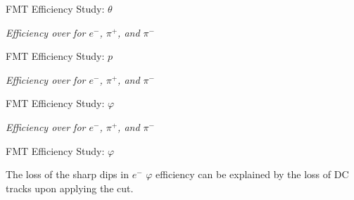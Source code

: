 \begin{frame}{FMT Efficiency Study: $\theta$}
    \begin{center}
        \vspace{-6pt}
        \begin{figure}[t]
        \end{figure}
        \textit{Efficiency over \ef{$\theta$} for $e^-$, $\pi^+$, and $\pi^-$}
    \end{center}

\end{frame}

\begin{frame}{FMT Efficiency Study: $p$}
    \begin{center}
        \vspace{-6pt}
        \begin{figure}[t]
        \end{figure}
        \textit{Efficiency over  for $e^-$, $\pi^+$, and $\pi^-$}
    \end{center}

\end{frame}

\begin{frame}{FMT Efficiency Study: $\varphi$}
    \begin{center}
        \vspace{-6pt}
        \begin{figure}[t]
        \end{figure}
        \textit{Efficiency over \ef{$\varphi$} for $e^-$, $\pi^+$, and $\pi^-$}
    \end{center}

\end{frame}

\begin{frame}{FMT Efficiency Study: $\varphi$}
    \label{20.04::fmt_efficiency_study_end}

    The loss of the sharp dips in $e^-$ $\varphi$ efficiency can be explained by the loss of DC tracks upon applying the cut.

    \begin{center}
        \begin{figure}[t]
        \end{figure}
    \end{center}

\end{frame}
